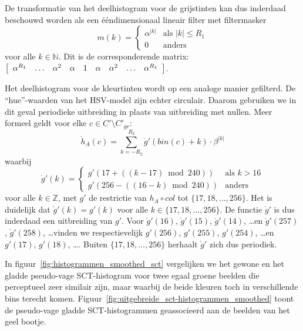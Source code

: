 De transformatie van het deelhistogram voor de grijstinten kan dus inderdaad beschouwd worden
als een \'e\'endimensionaal lineair filter met filtermasker 
\begin{displaymath}
m(k)= \begin{cases}
\alpha^{|k|} & \textrm{als } |k| \le R_1 \\ 
0 & \textrm{anders} 
\end{cases}
\end{displaymath}
voor alle $k \in \mathbb{N}$. Dit is de corresponderende matrix: 
$
\left[ \begin{array}{l@{\quad\ldots\quad}lllll@{\quad\ldots\quad}l} \alpha^{R_1} & \alpha^{2} & \alpha & 1 & \alpha & \alpha^{2} & \alpha^{R_1} \end{array} \right]
$.

Het deelhistogram voor de kleurtinten wordt op een analoge manier gefilterd. 
De ``hue''-waarden van het HSV-model zijn echter circulair. Daarom gebruiken we in dit geval
periodieke uitbreiding in plaats van uitbreiding met nullen. Meer formeel geldt voor 
elke $c \in C' \setminus C'_{gr}$:
\begin{displaymath}
\mathring{h}_A(c) = \sum_{k=-R_2}^{R_2} \mathring{g}'(bin(c)+k) \cdot \beta^{|k|}
\end{displaymath}
waarbij
\begin{displaymath}
\mathring{g}'(k) = \begin{cases}
g'(17  + ((k-17) \bmod 240)) & \textrm{als } k > 16 \\
g'(256 - ((16-k) \bmod 240)) & \textrm{anders}
\end{cases}
\end{displaymath}
voor alle $k \in \mathbb{Z}$, met $g'$ de restrictie van $h_A \circ col$
tot $\{17,18,\ldots,256\}$. Het is duidelijk dat $\mathring{g}'(k)=g'(k)$ voor alle 
$k \in \{17,18,\ldots,256\}$. De functie $\mathring{g}'$ is dus inderdaad een uitbreiding
van $g'$. Voor $\mathring{g}'(16)$, $\mathring{g}'(15)$, $\mathring{g}'(14)$, \ldots en
$\mathring{g}'(257)$, $\mathring{g}'(258)$, \ldots vinden we respectievelijk
$g'(256)$, $g'(255)$, $g'(254)$, \ldots en $g'(17)$, $g'(18)$, \ldots . Buiten
$\{17,18,\ldots,256\}$ herhaalt $\mathring{g}'$ zich dus periodiek. 

In figuur~\ref{fig:histogrammen_smoothed_sct} vergelijken we het gewone en het gladde pseudo-vage 
SCT-histogram voor twee egaal groene beelden die perceptueel zeer similair zijn, maar waarbij 
de beide kleuren toch in verschillende bins terecht komen. 
Figuur~\ref{fig:uitgebreide_sct-histogrammen_smoothed} toont de pseudo-vage gladde SCT-histogrammen 
geassocieerd aan de beelden van het geel bootje.


